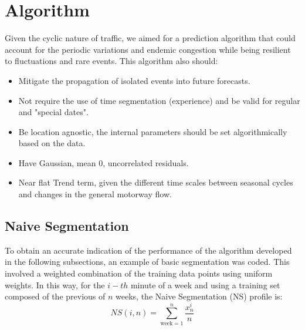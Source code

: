 \documentclass[conference]{IEEEtran}
\begin{document}
\section{Algorithm} \label{algorithm}
Given the cyclic nature of traffic, we aimed for a prediction algorithm that could account for the periodic variations and endemic congestion while being resilient to fluctuations and rare events. This algorithm also should:
\begin{itemize}
	\item Mitigate the propagation of isolated events into future forecasts.
	\item Not require the use of time segmentation (experience) and be valid for regular and "special dates".
	\item Be location agnostic, the internal parameters should be set algorithmically based on the data.
	\item Have Gaussian, mean 0, uncorrelated residuals.
	\item Near flat Trend term, given the different time scales between seasonal cycles and changes in the general motorway flow.
\end{itemize}

\subsection{Naive Segmentation}
To obtain an accurate indication of the performance of the algorithm developed in the following subsections, an example of basic segmentation was coded. 
This involved a weighted combination of the training data points using uniform weights. 
In this way, for the $i-th$ minute of a week and using a training set composed of the previous of $n$ weeks, the Naive Segmentation (NS) profile is:
\begin{equation}
NS(i,n) = \sum_{\textrm{week}=1}^{n} \frac{x^i_n}{n} 
\end{equation}
\end{document}
